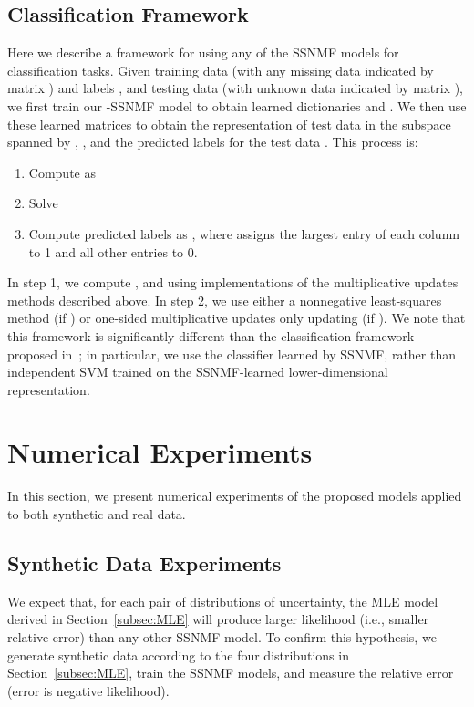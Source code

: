 \documentclass[twocolumn,10pt]{article}
\begin{document}
\subsection{Classification Framework} \label{sec:classification}
Here we describe a framework for using any of the SSNMF models for classification tasks.  
Given training data  (with any missing data indicated by matrix ) and labels , and testing data  (with unknown data indicated by matrix ), 
we first train our -SSNMF model 
to obtain learned dictionaries  and . We then use these learned matrices to obtain the representation of test data in the subspace spanned by , , and the predicted labels for the test data .  This process is: 
\begin{enumerate}
    \item Compute  as 
    \item Solve 
    \item 
    Compute predicted labels as , where  assigns the largest entry of each column to 1 and all other entries to 0.
\end{enumerate}
In step 1, we compute , and  using implementations of the multiplicative updates methods described above.  In step 2, we use either a nonnegative least-squares method (if ) or one-sided multiplicative updates only updating  (if ). We note that this framework is significantly different than the classification framework proposed in~\cite{lee2009semi}; in particular, we use the classifier  learned by SSNMF, rather than independent SVM trained on the SSNMF-learned lower-dimensional 
representation.

\section{Numerical Experiments}
\label{sec: numerical experiments}
In this section, we 
present numerical experiments of the proposed models applied to both synthetic and real data.


\subsection{Synthetic Data Experiments}\label{subsec:syntheticdata}

We expect that, for each pair of distributions of uncertainty, the MLE model derived in Section~\ref{subsec:MLE} will produce larger likelihood (i.e., smaller relative error) than any other SSNMF model. To confirm this hypothesis, we generate synthetic data according to the four distributions in Section~\ref{subsec:MLE}, train the SSNMF models, and measure the relative error (error is negative likelihood).  
\end{document}
